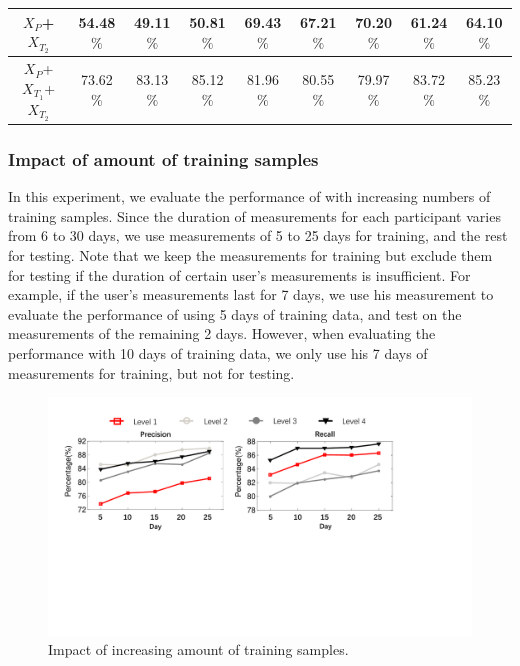 \begin{table}[h]
\begin{tabular}{|c|c|c|c|c|c|c|c|c|}
$X_{P}$+$X_{T_2}$                   & 54.48$\%$               & 49.11$\%$                                 & 50.81$\%$                & 69.43$\%$            & 67.21$\%$               & 70.20$\%$                                 & 61.24$\%$               & 64.10$\%$\\ \hline


$X_{P}$+$X_{T_1}$+$X_{T_2}$ & 73.62$\%$   & 83.13$\%$                                 & 85.12$\%$               & 81.96$\%$            & 80.55$\%$   & 79.97$\%$
  & 83.72$\%$               & 85.23$\%$                                  \\ \hline
  \end{tabular}
\end{table}


\subsubsection{Impact of amount of training samples}
In this experiment, we evaluate the performance of \sysname with increasing numbers of training samples.
Since the duration of measurements for each participant varies from 6 to 30 days, we use measurements of 5 to 25 days for training, and the rest for testing.
Note that we keep the measurements for training but exclude them for testing if the duration of certain user's measurements is insufficient.
For example, if the user's measurements last for 7 days, we use his measurement to evaluate the performance of using 5 days of training data, and test on the measurements of the remaining 2 days.
However, when evaluating the performance with 10 days of training data, we only use his 7 days of measurements for training, but not for testing.

\begin{figure}[h]
  \centering
  \includegraphics[width=0.9\columnwidth]{./img/performance_under_days1.pdf}
  \caption{Impact of increasing amount of training samples.}
  \label{fig:per_under_train_days}
\end{figure}

